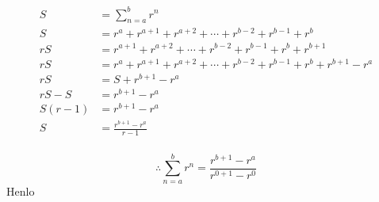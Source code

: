 \documentclass{article}
\begin{document}
\[\begin{aligned}
S&=\sum_{n=a}^{b}r^n\\
S&=r^a+r^{a+1}+r^{a+2}+\cdots+r^{b-2}+r^{b-1}+r^b\\
rS&=r^{a+1}+r^{a+2}+\cdots+r^{b-2}+r^{b-1}+r^b+r^{b+1}\\
rS&=r^a+r^{a+1}+r^{a+2}+\cdots+r^{b-2}+r^{b-1}+r^b+r^{b+1}-r^a\\
rS&=S+r^{b+1}-r^a\\
rS-S&=r^{b+1}-r^a\\
S(r-1)&=r^{b+1}-r^a\\
S&=\frac{r^{b+1}-r^a}{r-1}
\end{aligned}\]
\\
\[\therefore\boxed{\sum_{n=a}^{b}r^n=\frac{r^{b+1}-r^a}{r^{0+1}-r^0}}\]
Henlo
\end{document}

